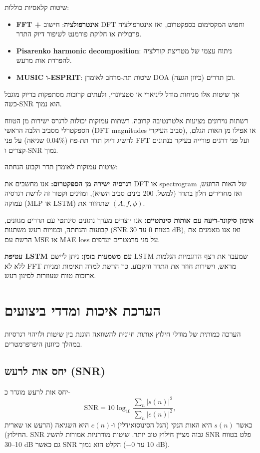שיטות קלאסיות כוללות:
\begin{itemize}
\item \textbf{FFT + אינטרפולציה}: חישוב DFT וחפוש המקסימום בספקטרום, ואז אינטרפולציה פרבולית או חלוקת פורמנט לשיפור דיוק התדר.
\item \textbf{Pisarenko harmonic decomposition}: ניתוח עצמי של מטריצת קורלציה להפרדת אות מרעש.
\item \textbf{MUSIC ו-ESPRIT}: שיטות תת-מרחב לאומדן DOA (כיוון הגעה) וכן תדרים.
\end{itemize}

אך שיטות אלו מניחות מודל ליניארי או סטציונרי, ולעתים קרובות מסתפקות בדיוק מוגבל כשה-SNR הוא נמוך.

רשתות נוירונים מציעות אלטרנטיבה קרובה. רשתות עמוקות יכולות לרגרס ישירות מן הטווח הספקטרלי מסביב הלבה הראשי (DFT magnitudes סביב העיקרי), או אפילו מן האות הגלם, להשיג דיוק תדר תת-פח (0.04\% שגיאה) על פני FFT ועל פני דרגים פורייה בעיקר בנתונים קצרים ו-SNR נמוך.

שיטות עמוקות לאומדן תדר וקבוע הנחתה:

\textbf{רגרסיה ישירה מן הספקטרום:} אנו מחשבים את DFT או spectrogram של האות הרועש, ואז מחדירים חלון בתדר (למשל, 200 בינים סביב השיא), ומזינים וקטור זה לרשת רגרסיה עמוקה (MLP או LSTM) שתחזור את $(A, f, \phi)$.

\textbf{אימון סיקונד-דיעה עם אותות סינתטיים:} אנו יוצרים מערך נתונים סינתטי עם תדרים מגוונים, קבועות והנחתה, וכמויות רעש משתנות (SNR בטווח 0 עד 30 dB), ואז אנו מאמנים את הרשת עם \textenglish{MSE} או \textenglish{MAE} loss על פני פרמטרים יעדפים.

\textbf{עטיפת LSTM עם משמעות בזמן:} ניתן ליישם LSTM שמעבד את רצף הדוגמיות הגלמות ללא לא FFT מראש, וישירות חוזר את התדר והקבוע. כך הרשת למדה תאימות זמניות ארוכות טווח שעוזרות לסינון רעש.

\section{הערכת איכות ומדדי ביצועים}

הערכה כמותית של מודלי חילוץ אותות חיונית להשוואה הוגנת בין שיטות ולזיהוי רגרסיות במהלך כיוונון היפרפרמטרים.

\subsection{יחס אות לרעש (SNR)}

יחס אות לרעש מוגדר כ-
\begin{equation}
\text{SNR} = 10 \log_{10} \frac{\sum_n |s(n)|^2}{\sum_n |e(n)|^2},
\end{equation}
כאשר $s(n)$ היא האות הנקי (הגל הסינוסואידלי) ו-$e(n)$ היא השגיאה (הרעש או שארית החילוץ). SNR גבוה מציין חילוץ טוב יותר. שיטות מודרניות אמורות להשיג SNR פלט בטווח 10--30 dB גם כאשר SNR הקלט הוא נמוך (−10 עד 0 dB).

